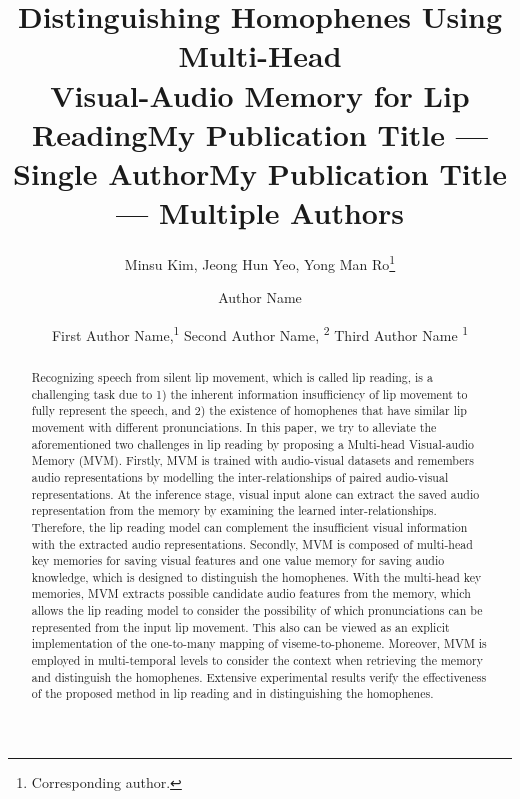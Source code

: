 \documentclass[letterpaper]{article} \usepackage{aaai22}  \usepackage{times}  \usepackage{helvet}  \usepackage{courier}  \usepackage[hyphens]{url}  \usepackage{graphicx} \urlstyle{rm} \def\UrlFont{\rm}  \usepackage{natbib}  \usepackage{caption} \DeclareCaptionStyle{ruled}{labelfont=normalfont,labelsep=colon,strut=off} \frenchspacing  \setlength{\pdfpagewidth}{8.5in}  \setlength{\pdfpageheight}{11in}  \usepackage{algorithm}
\title{Distinguishing Homophenes Using Multi-Head \\ Visual-Audio Memory for Lip Reading}
\author{
Minsu Kim, Jeong Hun Yeo, Yong Man Ro\thanks{Corresponding author.}
}
\title{My Publication Title --- Single Author}
\author {
    Author Name
}
\title{My Publication Title --- Multiple Authors}
\author {
First Author Name,\textsuperscript{\rm 1}
    Second Author Name, \textsuperscript{\rm 2}
    Third Author Name \textsuperscript{\rm 1}
}
\begin{document}
\maketitle

\begin{abstract}
Recognizing speech from silent lip movement, which is called lip reading, is a challenging task due to 1) the inherent information insufficiency of lip movement to fully represent the speech, and 2) the existence of homophenes that have similar lip movement with different pronunciations. In this paper, we try to alleviate the aforementioned two challenges in lip reading by proposing a Multi-head Visual-audio Memory (MVM). Firstly, MVM is trained with audio-visual datasets and remembers audio representations by modelling the inter-relationships of paired audio-visual representations. At the inference stage, visual input alone can extract the saved audio representation from the memory by examining the learned inter-relationships. Therefore, the lip reading model can complement the insufficient visual information with the extracted audio representations. Secondly, MVM is composed of multi-head key memories for saving visual features and one value memory for saving audio knowledge, which is designed to distinguish the homophenes. With the multi-head key memories, MVM extracts possible candidate audio features from the memory, which allows the lip reading model to consider the possibility of which pronunciations can be represented from the input lip movement. This also can be viewed as an explicit implementation of the one-to-many mapping of viseme-to-phoneme. Moreover, MVM is employed in multi-temporal levels to consider the context when retrieving the memory and distinguish the homophenes. Extensive experimental results verify the effectiveness of the proposed method in lip reading and in distinguishing the homophenes.

\end{abstract}
\end{document}
